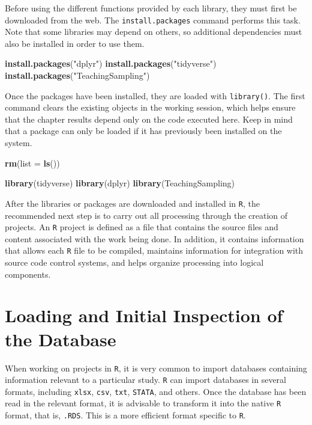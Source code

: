 \documentclass[
  english,
  12pt,
]{book}
\newenvironment{Shaded}{\begin{snugshade}}{\end{snugshade}}
\newcommand{\AttributeTok}[1]{\textcolor[rgb]{0.13,0.29,0.53}{#1}}
\newcommand{\FunctionTok}[1]{\textcolor[rgb]{0.13,0.29,0.53}{\textbf{#1}}}
\newcommand{\NormalTok}[1]{#1}
\newcommand{\StringTok}[1]{\textcolor[rgb]{0.31,0.60,0.02}{#1}}
\begin{document}
Before using the different functions provided by each library, they must first be downloaded from the web. The \texttt{install.packages} command performs this task. Note that some libraries may depend on others, so additional dependencies must also be installed in order to use them.

\begin{Shaded}
\begin{Highlighting}[]
\FunctionTok{install.packages}\NormalTok{(}\StringTok{"dplyr"}\NormalTok{)}
\FunctionTok{install.packages}\NormalTok{(}\StringTok{"tidyverse"}\NormalTok{)}
\FunctionTok{install.packages}\NormalTok{(}\StringTok{"TeachingSampling"}\NormalTok{)}
\end{Highlighting}
\end{Shaded}

Once the packages have been installed, they are loaded with \texttt{library()}. The first command clears the existing objects in the working session, which helps ensure that the chapter results depend only on the code executed here. Keep in mind that a package can only be loaded if it has previously been installed on the system.

\begin{Shaded}
\begin{Highlighting}[]
\FunctionTok{rm}\NormalTok{(}\AttributeTok{list =} \FunctionTok{ls}\NormalTok{())}

\FunctionTok{library}\NormalTok{(tidyverse)}
\FunctionTok{library}\NormalTok{(dplyr)}
\FunctionTok{library}\NormalTok{(TeachingSampling)}
\end{Highlighting}
\end{Shaded}

After the libraries or packages are downloaded and installed in \texttt{R}, the recommended next step is to carry out all processing through the creation of projects. An \texttt{R} project is defined as a file that contains the source files and content associated with the work being done. In addition, it contains information that allows each \texttt{R} file to be compiled, maintains information for integration with source code control systems, and helps organize processing into logical components.

\section{Loading and Initial Inspection of the Database}\label{carga-e-inspeccion-inicial-de-la-base}

When working on projects in \texttt{R}, it is very common to import databases containing information relevant to a particular study. \texttt{R} can import databases in several formats, including \texttt{xlsx}, \texttt{csv}, \texttt{txt}, \texttt{STATA}, and others. Once the database has been read in the relevant format, it is advisable to transform it into the native \texttt{R} format, that is, \texttt{.RDS}. This is a more efficient format specific to \texttt{R}.
\end{document}
